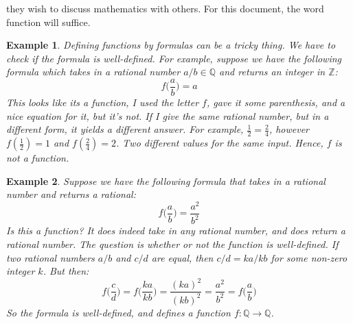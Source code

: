 \documentclass{article}
\theoremstyle{plain}
\theoremstyle{normal}
\newtheorem{example}{Example}[section]
\begin{document}
        they wish to discuss mathematics with others. For this document, the
        word function will suffice.
        \begin{example}
            Defining functions by formulas can be a tricky thing. We have to
            check if the formula is \textit{well-defined}. For example, suppose
            we have the following formula which takes in a rational number
            $a/b\in\mathbb{Q}$ and returns an integer in $\mathbb{Z}$:
            \begin{equation}
                f\big(\frac{a}{b}\big)=a
            \end{equation}
            This looks like its a function, I used the letter $f$, gave it
            some parenthesis, and a nice equation for it, but it's not.
            If I give the same rational number, but in a different form, it
            yields a different answer. For example,
            $\frac{1}{2}=\frac{2}{4}$, however $f(\frac{1}{2})=1$ and
            $f(\frac{2}{4})=2$. Two different values for the same input.
            Hence, $f$ is not a function.
        \end{example}
        \begin{example}
            Suppose we have the following formula that takes in a rational
            number and returns a rational:
            \begin{equation}
                f\big(\frac{a}{b}\big)=\frac{a^{2}}{b^{2}}
            \end{equation}
            Is this a function? It does indeed take in any rational number,
            and does return a rational number. The question is whether or not
            the function is well-defined. If two rational numbers $a/b$ and
            $c/d$ are equal, then $c/d = ka/kb$ for some non-zero integer $k$.
            But then:
            \begin{equation}
                f\big(\frac{c}{d}\big)=f\big(\frac{ka}{kb}\big)
                    =\frac{(ka)^{2}}{(kb)^{2}}
                    =\frac{a^{2}}{b^{2}}
                    =f\big(\frac{a}{b}\big)
            \end{equation}
            So the formula is well-defined, and defines a function
            $f:\mathbb{Q}\rightarrow\mathbb{Q}$.
        \end{example}
\end{document}
